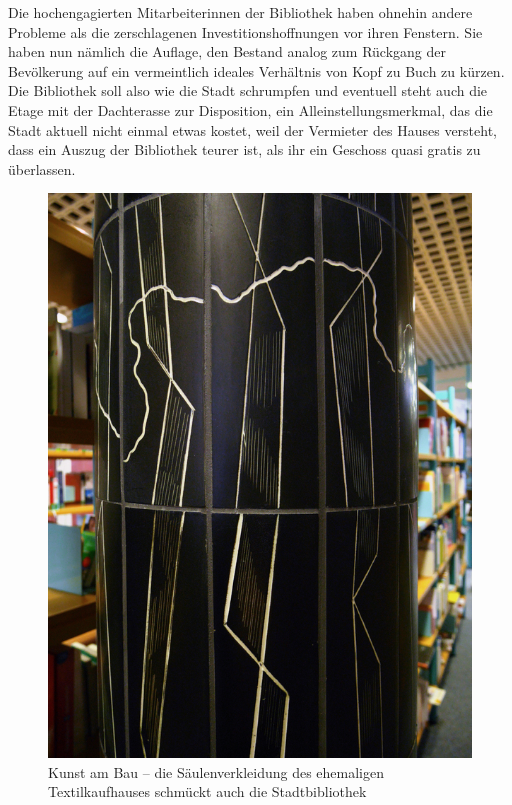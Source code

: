 \documentclass[a4paper,
fontsize=11pt,
oneside,
numbers=noperiodatend,
parskip=half-,
bibliography=totoc,
final
]{scrartcl}
\begin{document}
Die hochengagierten Mitarbeiterinnen der Bibliothek haben ohnehin andere
Probleme als die zerschlagenen Investitionshoffnungen vor ihren
Fenstern. Sie haben nun nämlich die Auflage, den Bestand analog zum
Rückgang der Bevölkerung auf ein vermeintlich ideales Verhältnis von
Kopf zu Buch zu kürzen. Die Bibliothek soll also wie die Stadt
schrumpfen und eventuell steht auch die Etage mit der Dachterasse zur
Disposition, ein Alleinstellungsmerkmal, das die Stadt aktuell nicht
einmal etwas kostet, weil der Vermieter des Hauses versteht, dass ein
Auszug der Bibliothek teurer ist, als ihr ein Geschoss quasi gratis zu
überlassen.

\begin{figure}
\centering
\includegraphics{img/image_3.jpg}
\caption{Kunst am Bau -- die Säulenverkleidung des ehemaligen
Textilkaufhauses schmückt auch die Stadtbibliothek}
\end{figure}
\end{document}
